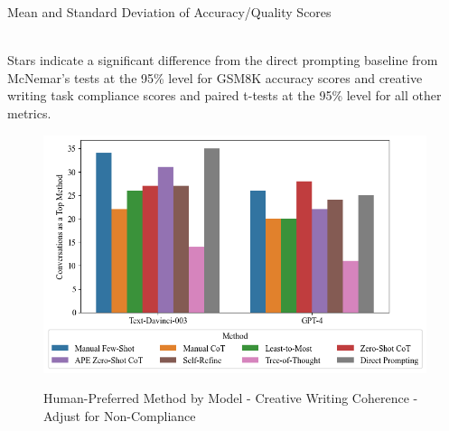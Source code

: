 \documentclass[11pt]{article}
\begin{document}
\begin{centering}


  


  \begin{table}
    \caption{Mean and Standard Deviation of Accuracy/Quality Scores}
    \centering
    \tiny
      
    \label{tab:accuracy_quality}
    \\[10pt] \footnotesize Stars indicate a significant difference from the direct prompting baseline from McNemar's tests at the 95\% level for GSM8K accuracy scores and creative writing task compliance scores and paired t-tests at the 95\% level for all other metrics.
  \end{table}

  \begin{figure}
    \caption{Human-Preferred Method by Model - Creative Writing Coherence - Adjust for Non-Compliance}
    \centering
    \includegraphics[width=\textwidth]{../Output for Report/cw_preference_plot_coherence_1_incoherent_10_very_coherent_compliance_adjusted.png}
    \label{fig:cw_preference_plot_ca}
  \end{figure}


\end{centering}
\end{document}
